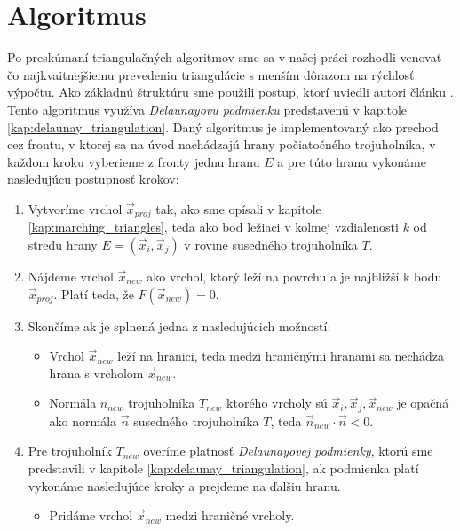 \chapter{Algoritmus}
\label{kap:algoritmus}
Po preskúmaní triangulačných algoritmov sme sa v našej práci rozhodli venovať čo najkvaitnejšiemu
prevedeniu triangulácie s menším dôrazom na rýchlosť výpočtu. Ako základnú štruktúru sme použili 
postup, ktorí uviedli autori článku \cite{hilton1996marching}. Tento algoritmus využíva 
\textit{Delaunayovu podmienku} predstavenú v kapitole \ref{kap:delaunay_triangulation}.
Daný algoritmus je implementovaný ako prechod cez frontu, v ktorej sa na úvod nachádzajú
hrany počiatočného trojuholníka, v každom kroku vyberieme z fronty jednu hranu $E$ a pre túto
hranu vykonáme nasledujúcu postupnosť krokov:
\begin{enumerate}
    \item{Vytvoríme vrchol $\overrightarrow{x}_{proj}$ tak, ako sme opísali v kapitole \ref{kap:marching_triangles}, teda 
    ako bod ležiaci v kolmej vzdialenosti $k$ od stredu hrany $E = (\overrightarrow{x}_i, \overrightarrow{x}_j)$ 
    v rovine susedného trojuholníka $T$.}
    \item{Nájdeme vrchol $\overrightarrow{x}_{new}$ ako vrchol, ktorý leží na povrchu a je najbližší k bodu 
    $\overrightarrow{x}_{proj}$. 
    Platí teda, že $F(\overrightarrow{x}_{new}) = 0$.}
    \item{Skončíme ak je splnená jedna z nasledujúcich možností:
    \begin{itemize}
        \item{Vrchol $\overrightarrow{x}_{new}$ leží na hranici, teda medzi hraničnými 
        hranami sa nechádza hrana s vrcholom $\overrightarrow{x}_{new}$.}
        \item{Normála $n_{new}$ trojuholníka $T_{new}$ ktorého vrcholy sú $\overrightarrow{x}_i, 
        \overrightarrow{x}_j, \overrightarrow{x}_{new}$ je opačná ako
        normála $\overrightarrow{n}$ susedného trojuholníka $T$, teda 
        $\overrightarrow{n}_{new} \cdot \overrightarrow{n} < 0$.}
    \end{itemize}
    }
    \item{Pre trojuholník $T_{new}$ overíme platnosť \textit{Delaunayovej podmienky}, 
    ktorú sme predstavili v kapitole \ref{kap:delaunay_triangulation}, ak podmienka platí
    vykonáme nasledujúce kroky a prejdeme na ďalšiu hranu.
    \begin{itemize}
        \item{Pridáme vrchol $\overrightarrow{x}_{new}$ medzi hraničné vrcholy.}

\end{itemize}}
\end{enumerate}
